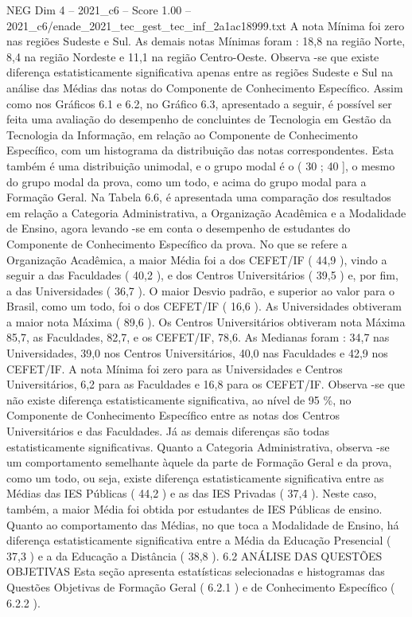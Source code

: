 \begin{textsample}{NEG Dim 4 – 2021\_c6 – Score 1.00 – 2021\_c6/enade\_2021\_tec\_gest\_tec\_inf\_2a1ac18999.txt}
A nota Mínima foi zero nas regiões Sudeste e Sul.
As demais notas Mínimas foram : 18,8 na região Norte, 8,4 na região Nordeste e 11,1 na região Centro-Oeste.
Observa -se que existe diferença estatisticamente significativa apenas entre as regiões Sudeste e Sul na análise das Médias das notas do Componente de Conhecimento Específico.
Assim como nos Gráficos 6.1 e 6.2, no Gráfico 6.3, apresentado a seguir, é possível ser feita uma avaliação do desempenho de concluintes de Tecnologia em Gestão da Tecnologia da Informação, em relação ao Componente de Conhecimento Específico, com um histograma da distribuição das notas correspondentes.
Esta também é uma distribuição unimodal, e o grupo modal é o ( 30 ; 40 ], o mesmo do grupo modal da prova, como um todo, e acima do grupo modal para a Formação Geral.
Na Tabela 6.6, é apresentada uma comparação dos resultados em relação a Categoria Administrativa, a Organização Acadêmica e a Modalidade de Ensino, agora levando -se em conta o desempenho de estudantes do Componente de Conhecimento Específico da prova.
No que se refere a Organização Acadêmica, a maior Média foi a dos CEFET/IF ( 44,9 ), vindo a seguir a das Faculdades ( 40,2 ), e dos Centros Universitários ( 39,5 ) e, por fim, a das Universidades ( 36,7 ).
O maior Desvio padrão, e superior ao valor para o Brasil, como um todo, foi o dos CEFET/IF ( 16,6 ).
As Universidades obtiveram a maior nota Máxima ( 89,6 ).
Os Centros Universitários obtiveram nota Máxima 85,7, as Faculdades, 82,7, e os CEFET/IF, 78,6.
As Medianas foram : 34,7 nas Universidades, 39,0 nos Centros Universitários, 40,0 nas Faculdades e 42,9 nos CEFET/IF.
A nota Mínima foi zero para as Universidades e Centros Universitários, 6,2 para as Faculdades e 16,8 para os CEFET/IF.
Observa -se que não existe diferença estatisticamente significativa, ao nível de 95 \%, no Componente de Conhecimento Específico entre as notas dos Centros Universitários e das Faculdades.
Já as demais diferenças são todas estatisticamente significativas.
Quanto a Categoria Administrativa, observa -se um comportamento semelhante àquele da parte de Formação Geral e da prova, como um todo, ou seja, existe diferença estatisticamente significativa entre as Médias das IES Públicas ( 44,2 ) e as das IES Privadas ( 37,4 ).
Neste caso, também, a maior Média foi obtida por estudantes de IES Públicas de ensino.
Quanto ao comportamento das Médias, no que toca a Modalidade de Ensino, há diferença estatisticamente significativa entre a Média da Educação Presencial ( 37,3 ) e a da Educação a Distância ( 38,8 ). 6.2 ANÁLISE DAS QUESTÕES OBJETIVAS Esta seção apresenta estatísticas selecionadas e histogramas das Questões Objetivas de Formação Geral ( 6.2.1 ) e de Conhecimento Específico ( 6.2.2 ).

\end{textsample}
